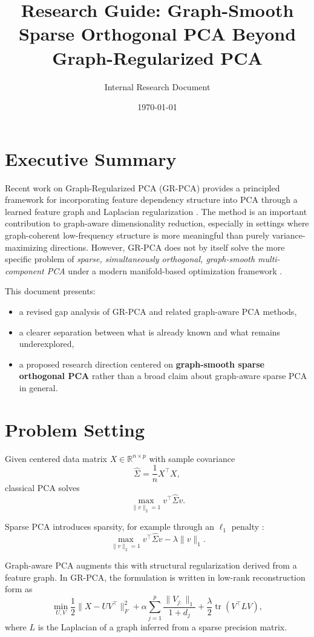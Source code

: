 \documentclass[11pt]{article}
\title{Research Guide: Graph-Smooth Sparse Orthogonal PCA Beyond Graph-Regularized PCA}
\author{Internal Research Document}
\date{\today}
\begin{document}
\maketitle

\section{Executive Summary}

Recent work on Graph-Regularized PCA (GR-PCA) provides a principled framework for incorporating feature dependency structure into PCA through a learned feature graph and Laplacian regularization \cite{briola2026grpca}. The method is an important contribution to graph-aware dimensionality reduction, especially in settings where graph-coherent low-frequency structure is more meaningful than purely variance-maximizing directions. However, GR-PCA does not by itself solve the more specific problem of \emph{sparse, simultaneously orthogonal, graph-smooth multi-component PCA} under a modern manifold-based optimization framework \cite{chen2020amanpg,chen2024nonsmoothstiefel}.

This document presents:
\begin{itemize}
    \item a revised gap analysis of GR-PCA and related graph-aware PCA methods,
    \item a clearer separation between what is already known and what remains underexplored,
    \item a proposed research direction centered on \textbf{graph-smooth sparse orthogonal PCA} rather than a broad claim about graph-aware sparse PCA in general.
\end{itemize}

\section{Problem Setting}

Given centered data matrix $X \in \mathbb{R}^{n \times p}$ with sample covariance
\[
\widehat{\Sigma} = \frac{1}{n} X^\top X,
\]
classical PCA solves
\[
\max_{\|v\|_2 = 1} v^\top \widehat{\Sigma} v.
\]

Sparse PCA introduces sparsity, for example through an $\ell_1$ penalty \cite{zou2006spca}:
\[
\max_{\|v\|_2 = 1} v^\top \widehat{\Sigma} v - \lambda \|v\|_1.
\]

Graph-aware PCA augments this with structural regularization derived from a feature graph. In GR-PCA, the formulation is written in low-rank reconstruction form as \cite{briola2026grpca}
\[
\min_{U,V} \frac{1}{2}\|X - UV^\top\|_F^2
+ \alpha \sum_{j=1}^p \frac{\|V_{j:}\|_1}{1+d_j}
+ \frac{\lambda}{2}\operatorname{tr}(V^\top L V),
\]
where $L$ is the Laplacian of a graph inferred from a sparse precision matrix.
\end{document}
